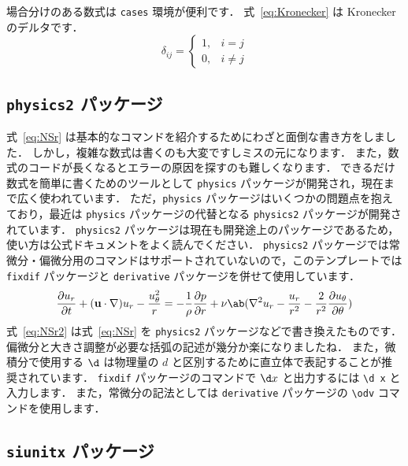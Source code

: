 場合分けのある数式は \verb|cases| 環境が便利です．
式~\eqref{eq:Kronecker} は Kronecker のデルタです．
\begin{equation}
    \delta_{ij} = 
    \begin{cases}
        1, & i = j \\
        0, & i \neq j
    \end{cases}
    \label{eq:Kronecker}
\end{equation}

\subsection{\texttt{physics2} パッケージ}
\label{ssec:physics2}

式~\eqref{eq:NSr} は基本的なコマンドを紹介するためにわざと面倒な書き方をしました．
しかし，複雑な数式は書くのも大変ですしミスの元になります．
また，数式のコードが長くなるとエラーの原因を探すのも難しくなります．
できるだけ数式を簡単に書くためのツールとして \verb|physics| パッケージが開発され，現在まで広く使われています．
ただ，\verb|physics| パッケージはいくつかの問題点を抱えており，最近は \verb|physics| パッケージの代替となる \verb|physics2| パッケージが開発されています．
\verb|physics2| パッケージは現在も開発途上のパッケージであるため，使い方は公式ドキュメントをよく読んでください．
\verb|physics2| パッケージでは常微分・偏微分用のコマンドはサポートされていないので，このテンプレートでは \verb|fixdif| パッケージと \verb|derivative| パッケージを併せて使用しています．
\begin{equation}
    \pdv{u_r}{t} + (\mathbf{u}\cdot\nabla)u_r - \frac{u_\theta^2}{r} = -\frac{1}{\rho}\pdv{p}{r} + \nu\ab(\nabla^2 u_r - \frac{u_r}{r^2} - \frac{2}{r^2}\pdv{u_\theta}{\theta})
    \label{eq:NSr2}
\end{equation}
式~\eqref{eq:NSr2} は式~\eqref{eq:NSr} を \verb|physics2| パッケージなどで書き換えたものです．
偏微分と大きさ調整が必要な括弧の記述が幾分か楽になりましたね．
また，微積分で使用する $\d$ は物理量の $d$ と区別するために直立体で表記することが推奨されています．
\verb|fixdif| パッケージのコマンドで $\d x$ と出力するには \verb|\d x| と入力します．
また，常微分の記法としては \verb|derivative| パッケージの \verb|\odv| コマンドを使用します．

\subsection{\texttt{siunitx} パッケージ}
\label{ssec:siunitx}

